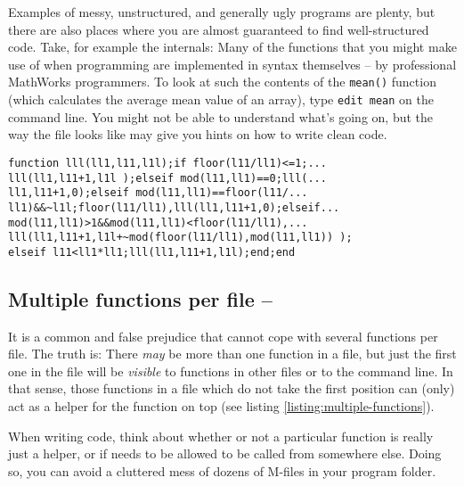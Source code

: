 Examples of messy, unstructured, and generally ugly programs are plenty, but there are also places where you are almost guaranteed to find well-structured code. Take, for example the \matlab{} internals: Many of the functions that you might make use of when programming \matlab{} are implemented in \matlab{} syntax themselves -- by professional MathWorks programmers. To look at such the contents of the \lstinline!mean()! function (which calculates the average mean value of an array), type \lstinline!edit mean! on the \matlab{} command line. You might not be able to understand what's going on, but the way the file looks like may give you hints on how to write clean code.


\begin{lstlisting}[framerule=2pt,rulecolor=\color{badred},float=b,label={listing:prime1},caption={Perfectly legal \matlab{} code, with all rules of style ignored. Can you guess what this function does?}]
function lll(ll1,l11,l1l);if floor(l11/ll1)<=1;...
lll(ll1,l11+1,l1l );elseif mod(l11,ll1)==0;lll(...
ll1,l11+1,0);elseif mod(l11,ll1)==floor(l11/...
ll1)&&~l1l;floor(l11/ll1),lll(ll1,l11+1,0);elseif...
mod(l11,ll1)>1&&mod(l11,ll1)<floor(l11/ll1),...
lll(ll1,l11+1,l1l+~mod(floor(l11/ll1),mod(l11,ll1)) );
elseif l11<ll1*ll1;lll(ll1,l11+1,l1l);end;end
\end{lstlisting}

\subsection{Multiple functions per file  -- \cleansymbol\cleansymbol\cleansymbol}
It is a common and false prejudice that \matlab{} cannot cope with several functions per file. The truth is: There \emph{may} be more than one function in a file, but just the first one in the file will be \emph{visible} to functions in other files or to the command line. In that sense, those functions in a file which do not take the first position can (only) act as a helper for the function on top (see listing \ref{listing:multiple-functions}).

When writing code, think about whether or not a particular function is really just a helper, or if needs to be allowed to be called from somewhere else. Doing so, you can avoid a cluttered mess of dozens of M-files in your program folder.

